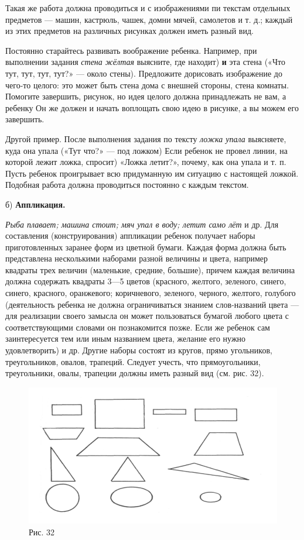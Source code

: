 \documentclass[a5paper]{book}
\renewcommand{\emph}[1]{\textit{#1}}
\begin{document}
Такая же работа должна проводиться и с изображениями пи текстам
отдельных предметов --- машин, кастрюль, чашек, домни мячей, самолетов и
т. д.; каждый из этих предметов на различных рисунках должен иметь
разный вид.

Постоянно старайтесь развивать воображение ребенка. Например, при
выполнении задания \emph{стена жёлтая} выясните, где находит) \textbf{и}
эта стена («Что тут, тут, тут, тут?» --- около стены). Предложите
дорисовать изображение до чего-то целого: это может быть стена дома с
внешней стороны, стена комнаты. Помогите завершить, рисунок, но идея
целого должна принадлежать не вам, а ребенку Он же должен и начать
воплощать свою идею в рисунке, а вы можем его завершить.

Другой пример. После выполнения задания по тексту \emph{ложка упала}
выясняете, куда она упала («Тут что?» --- под ложком) Если ребенок не
провел линии, на которой лежит ложка, спросит) «Ложка летит?», почему,
как она упала и т. п. Пусть ребенок проигрывает всю придуманную им
ситуацию с настоящей ложкой. Подобная работа должна проводиться
постоянно с каждым текстом.

б) \textbf{Аппликация.}

\emph{Рыба плавает; машина стоит; мяч упал в воду; летит само лёт} и др.
Для составления (конструирования) аппликации ребенок получает наборы
приготовленных заранее форм из цветной бумаги. Каждая форма должна быть
представлена несколькими наборами разной величины и цвета, например
квадраты трех величин (маленькие, средние, большие), причем каждая
величина должна содержать квадраты 3---5 цветов (красного, желтого,
зеленого, синего, синего, красного, оранжевого; коричневого, зеленого,
черного, желтого, голубого (деятельность ребенка не должна
ограничиваться знанием слов-названий цвета --- для реализации своего
замысла он может пользоваться бумагой любого цвета с соответствующими
словами он познакомится позже. Если же ребенок сам заинтересуется тем
или иным названием цвета, желание его нужно удовлетворить) и др. Другие
наборы состоят из кругов, прямо угольников, треугольников, овалов,
трапеций. Следует учесть, что прямоугольники, треугольники, овалы,
трапеции должны иметь разный вид (см. рис. 32).

\begin{figure}
\centering
\includegraphics[width=\linewidth]{media/media/image29.png}
\caption*{Рис. 32}
\end{figure}
\end{document}
